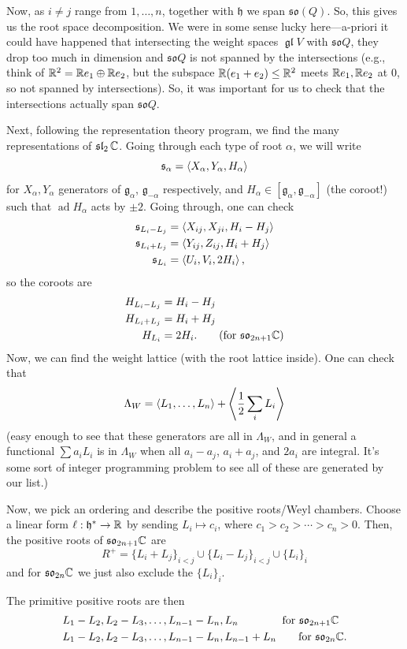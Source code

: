 \documentclass[12pt]{article}
\newcommand{\fg}{\mathfrak{g}}
\newcommand{\fh}{\mathfrak{h}}
\newcommand{\gl}{\operatorname{\mathfrak{gl}}}
\newcommand{\fs}{\mathfrak{s}}
\DeclareMathOperator{\ad}{ad}
\newcommand{\so}{\mathfrak{so}}
\newcommand{\fsl}{\operatorname{\mathfrak{sl}}}
\begin{document}
Now, as $i\neq j$ range from $1,\dots,n$, together with $\fh$ we span $\so(Q)$. So, this gives us the root space decomposition. We were in some sense lucky here---a-priori it could have happened that intersecting the weight spaces $\gl V$ with $\so Q$, they drop too much in dimension and $\so Q$ is not spanned by the intersections (e.g., think of $\mathbb{R}^2 = \mathbb{R} e_1 \oplus \mathbb{R} e_2$, but the subspace $\mathbb{R}(e_1+e_2) \leq \mathbb{R}^2$ meets $\mathbb{R} e_1, \mathbb{R} e_2$ at $0$, so not spanned by intersections). So, it was important for us to check that the intersections actually span $\so Q$.

Next, following the representation theory program, we find the many representations of $\fsl_2 \C$. Going through each type of root $\alpha$, we will write
\[\fs_\alpha = \<X_\alpha, Y_\alpha, H_\alpha\>\]
for $X_\alpha,Y_\alpha$ generators of $\fg_\alpha$, $\fg_{-\alpha}$ respectively, and $H_\alpha \in [\fg_\alpha,\fg_{-\alpha}]$ (the coroot!) such that $\ad H_{\alpha}$ acts by $\pm 2$. Going through, one can check
\begin{align*}
    \fs_{L_i-L_j} &= \<X_{ij},X_{ji},H_i-H_j\>\\
    \fs_{L_i+L_j} &= \<Y_{ij},Z_{ij},H_i+H_j\>\\
    \fs_{L_i} &= \<U_i,V_i,2H_i\>,
\end{align*}
so the coroots are
\begin{align*}
    H_{L_i-L_j} &= H_i-H_j\\
    H_{L_i+L_j} &= H_i + H_j\\
    H_{L_i} &= 2H_i. \tag{for $\so_{2n+1}\C$}
\end{align*}
Now, we can find the weight lattice (with the root lattice inside). One can check that
\[\Lambda_W = \left\langle L_1,\dots,L_n\right\rangle + \left\langle\frac{1}{2}\sum_i L_i\right\rangle\]
(easy enough to see that these generators are all in $\Lambda_W$, and in general a functional $\sum a_i L_i$ is in $\Lambda_W$ when all $a_i-a_j$, $a_i+a_j$, and $2a_i$ are integral. It's some sort of integer programming problem to see all of these are generated by our list.)

Now, we pick an ordering and describe the positive roots/Weyl chambers. Choose a linear form $\ell: \fh^* \to \R$ by sending $L_i \mapsto c_i$, where $c_1>c_2>\cdots>c_n>0$. Then, the positive roots of $\so_{2n+1}\C$ are
\[R^+ = \{L_i + L_j\}_{i<j} \cup \{L_i - L_j\}_{i<j} \cup \{L_i\}_i\]
and for $\so_{2n}\C$ we just also exclude the $\{L_i\}_{i}$.

The primitive positive roots are then
\begin{align*}
    &L_1-L_2,L_2-L_3,\dots,L_{n-1}-L_n,L_n \qquad\qquad \text{for $\so_{2n+1}\C$}\\
    &L_1-L_2,L_2-L_3,\dots,L_{n-1}-L_n,L_{n-1}+L_n \qquad \text{for $\so_{2n}\C$}.
\end{align*}
\end{document}
